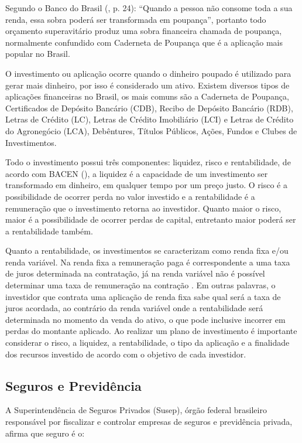 Segundo o Banco do Brasil (\citeyear{bb2012}, p. 24): “Quando a pessoa não consome toda a sua renda, essa sobra poderá ser transformada em poupança”, portanto todo orçamento superavitário produz uma sobra financeira chamada de poupança, normalmente confundido com Caderneta de Poupança que é a aplicação mais popular no Brasil.

O investimento ou aplicação ocorre quando o dinheiro poupado é utilizado para gerar mais dinheiro, por isso é considerado um ativo. Existem diversos tipos de aplicações financeiras no Brasil, os mais comuns são a Caderneta de Poupança, Certificados de Depósito Bancário (CDB), Recibo de Depósito Bancário (RDB), Letras de Crédito (LC), Letras de Crédito Imobiliário (LCI) e Letras de Crédito do Agronegócio (LCA), Debêntures, Títulos Públicos, Ações, Fundos e Clubes de Investimentos.

Todo o investimento possui três componentes: liquidez, risco e rentabilidade, de acordo com BACEN (\citeyear{bacen2013}), a liquidez é a capacidade de um investimento ser transformado em dinheiro, em qualquer tempo por um preço justo. O risco é a possibilidade de ocorrer perda no valor investido e a rentabilidade é a remuneração que o investimento retorna ao investidor. Quanto maior o risco, maior é a possibilidade de ocorrer perdas de capital, entretanto maior poderá ser a rentabilidade também.

Quanto a rentabilidade, os investimentos se caracterizam como renda fixa e/ou renda variável. Na renda fixa a remuneração paga é correspondente a uma taxa de juros determinada na contratação, já na renda variável não é possível determinar uma taxa de remuneração na contração \cite{bacen2013}. Em outras palavras, o investidor que contrata uma aplicação de renda fixa sabe qual será a taxa de juros acordada, ao contrário da renda variável onde a rentabilidade será determinada no momento da venda do ativo, o que pode inclusive incorrer em perdas do montante aplicado. Ao realizar um plano de investimento é importante considerar o risco, a liquidez, a rentabilidade, o tipo da aplicação e a finalidade dos recursos investido de acordo com o objetivo de cada investidor.

\subsection{Seguros e Previdência}
A Superintendência de Seguros Privados (Susep), órgão federal brasileiro responsável por fiscalizar e controlar empresas de seguros e previdência privada, afirma que seguro é o:


